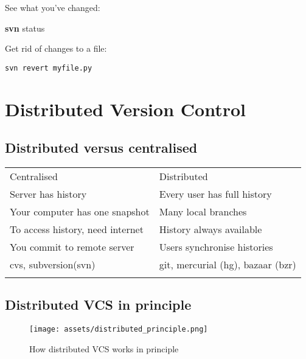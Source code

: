 \documentclass[]{scrartcl}
\makeatletter
\newenvironment{Shaded}{}{}
\newcommand{\KeywordTok}[1]{\textcolor[rgb]{0.00,0.44,0.13}{\textbf{{#1}}}}
\newcommand{\NormalTok}[1]{{#1}}
\def\maxwidth{\ifdim\Gin@nat@width>\linewidth\linewidth
\else\Gin@nat@width\fi}
\let\Oldincludegraphics\includegraphics
\renewcommand{\includegraphics}[1]{\Oldincludegraphics[width=\maxwidth]{#1}}
\makeatother
\begin{document}
See what you've changed:

\begin{Shaded}
\begin{Highlighting}[]
\KeywordTok{svn} \NormalTok{status}
\end{Highlighting}
\end{Shaded}

Get rid of changes to a file:

\begin{verbatim}
svn revert myfile.py
\end{verbatim}

\section{Distributed Version Control}\label{distributed-version-control}

\subsection{Distributed versus
centralised}\label{distributed-versus-centralised}

\begin{longtable}[c]{@{}ll@{}}
\hline\noalign{\medskip}
Centralised & Distributed
\\\noalign{\medskip}
\hline\noalign{\medskip}
Server has history & Every user has full history
\\\noalign{\medskip}
Your computer has one snapshot & Many local branches
\\\noalign{\medskip}
To access history, need internet & History always available
\\\noalign{\medskip}
You commit to remote server & Users synchronise histories
\\\noalign{\medskip}
cvs, subversion(svn) & git, mercurial (hg), bazaar (bzr)
\\\noalign{\medskip}
\hline
\end{longtable}

\subsection{Distributed VCS in
principle}\label{distributed-vcs-in-principle}

\begin{figure}[htbp]
\centering
\texttt{[image: assets/distributed\_principle.png]}
\caption{How distributed VCS works in principle}
\end{figure}
\end{document}
